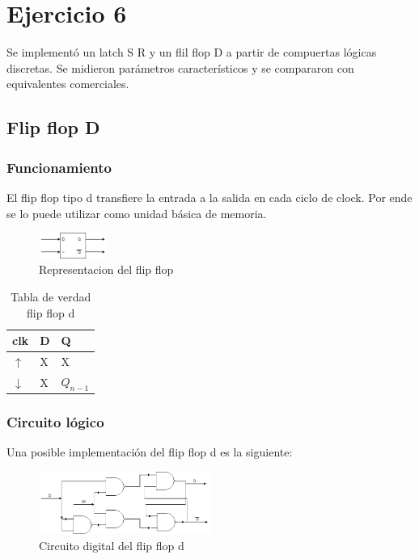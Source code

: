 \documentclass[../../e3_tp2_main.tex]{subfiles}
\begin{document}
\section{Ejercicio 6}

Se implementó un latch S R y un flil flop D a partir de compuertas lógicas discretas. Se midieron parámetros característicos y se compararon con equivalentes comerciales.
\subsection{Flip flop D}
\subsubsection{Funcionamiento}
El flip flop tipo d transfiere la entrada a la salida en cada ciclo de clock. Por ende se lo puede utilizar como unidad básica de memoria.
\begin{figure}[H]	
	\centering
	\includegraphics[width=0.2\textwidth]{imagenes/ffd_b.png}
	\caption{Representacion del flip flop}
\end{figure}

\begin{table}[h]
\begin{center}
\begin{tabular}{|l|l|l|}
\hline
clk& D & Q\\
\hline \hline
$\uparrow$ & X & X \\ \hline
$\downarrow$ &X  &$Q_{n-1}$ \\ \hline
\end{tabular}
\caption{Tabla de verdad flip flop d} 
\end{center}
\end{table}

\subsubsection{Circuito lógico}
Una posible implementación del flip flop d es la siguiente:
\begin{figure}[H]	
	\centering
	\includegraphics[width=0.5\textwidth]{imagenes/ffd_cd.png}
	\caption{Circuito digital del flip flop d}
\end{figure}
\end{document}
